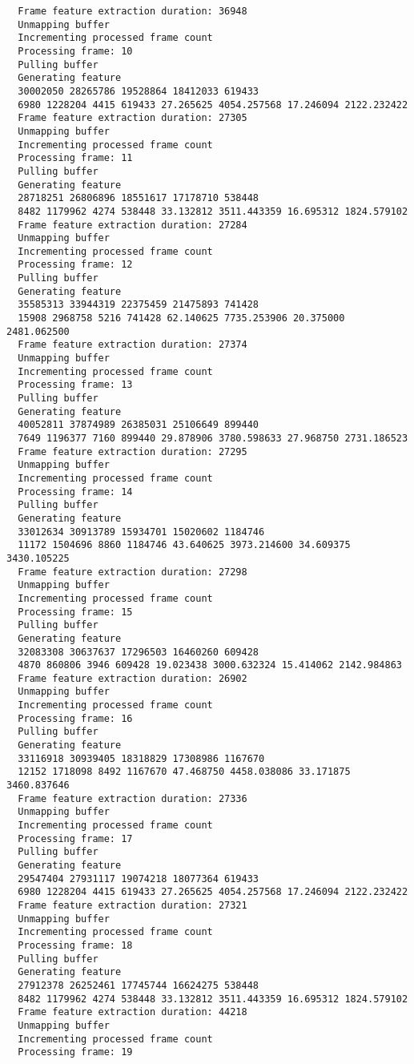 \documentclass[12pt,oneside]{book}
\begin{document}
\begin{lstlisting}
  Frame feature extraction duration: 36948
  Unmapping buffer
  Incrementing processed frame count
  Processing frame: 10
  Pulling buffer
  Generating feature
  30002050 28265786 19528864 18412033 619433
  6980 1228204 4415 619433 27.265625 4054.257568 17.246094 2122.232422
  Frame feature extraction duration: 27305
  Unmapping buffer
  Incrementing processed frame count
  Processing frame: 11
  Pulling buffer
  Generating feature
  28718251 26806896 18551617 17178710 538448
  8482 1179962 4274 538448 33.132812 3511.443359 16.695312 1824.579102
  Frame feature extraction duration: 27284
  Unmapping buffer
  Incrementing processed frame count
  Processing frame: 12
  Pulling buffer
  Generating feature
  35585313 33944319 22375459 21475893 741428
  15908 2968758 5216 741428 62.140625 7735.253906 20.375000 2481.062500
  Frame feature extraction duration: 27374
  Unmapping buffer
  Incrementing processed frame count
  Processing frame: 13
  Pulling buffer
  Generating feature
  40052811 37874989 26385031 25106649 899440
  7649 1196377 7160 899440 29.878906 3780.598633 27.968750 2731.186523
  Frame feature extraction duration: 27295
  Unmapping buffer
  Incrementing processed frame count
  Processing frame: 14
  Pulling buffer
  Generating feature
  33012634 30913789 15934701 15020602 1184746
  11172 1504696 8860 1184746 43.640625 3973.214600 34.609375 3430.105225
  Frame feature extraction duration: 27298
  Unmapping buffer
  Incrementing processed frame count
  Processing frame: 15
  Pulling buffer
  Generating feature
  32083308 30637637 17296503 16460260 609428
  4870 860806 3946 609428 19.023438 3000.632324 15.414062 2142.984863
  Frame feature extraction duration: 26902
  Unmapping buffer
  Incrementing processed frame count
  Processing frame: 16
  Pulling buffer
  Generating feature
  33116918 30939405 18318829 17308986 1167670
  12152 1718098 8492 1167670 47.468750 4458.038086 33.171875 3460.837646
  Frame feature extraction duration: 27336
  Unmapping buffer
  Incrementing processed frame count
  Processing frame: 17
  Pulling buffer
  Generating feature
  29547404 27931117 19074218 18077364 619433
  6980 1228204 4415 619433 27.265625 4054.257568 17.246094 2122.232422
  Frame feature extraction duration: 27321
  Unmapping buffer
  Incrementing processed frame count
  Processing frame: 18
  Pulling buffer
  Generating feature
  27912378 26252461 17745744 16624275 538448
  8482 1179962 4274 538448 33.132812 3511.443359 16.695312 1824.579102
  Frame feature extraction duration: 44218
  Unmapping buffer
  Incrementing processed frame count
  Processing frame: 19

\end{lstlisting}
\end{document}

